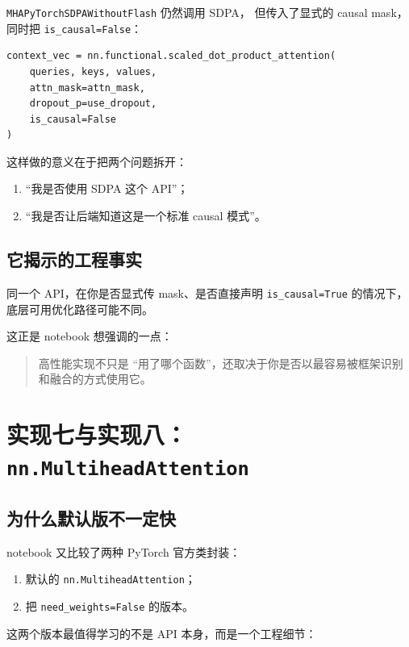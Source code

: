 \documentclass[12pt,a4paper]{ctexart}
\newcommand{\code}[1]{\texttt{#1}}
\begin{document}
\code{MHAPyTorchSDPAWithoutFlash} 仍然调用 SDPA，
但传入了显式的 causal mask，同时把 \code{is\_causal=False}：

\begin{lstlisting}[style=py]
context_vec = nn.functional.scaled_dot_product_attention(
    queries, keys, values,
    attn_mask=attn_mask,
    dropout_p=use_dropout,
    is_causal=False
)
\end{lstlisting}

这样做的意义在于把两个问题拆开：

\begin{enumerate}
  \item ``我是否使用 SDPA 这个 API''；
  \item ``我是否让后端知道这是一个标准 causal 模式''。
\end{enumerate}

\subsection{它揭示的工程事实}

同一个 API，在你是否显式传 mask、是否直接声明 \code{is\_causal=True}
的情况下，底层可用优化路径可能不同。

这正是 notebook 想强调的一点：

\begin{quote}
高性能实现不只是 ``用了哪个函数''，还取决于你是否以最容易被框架识别和融合的方式使用它。
\end{quote}

\section{实现七与实现八：\texorpdfstring{\code{nn.MultiheadAttention}}{nn.MultiheadAttention}}

\subsection{为什么默认版不一定快}

notebook 又比较了两种 PyTorch 官方类封装：

\begin{enumerate}
  \item 默认的 \code{nn.MultiheadAttention}；
  \item 把 \code{need\_weights=False} 的版本。
\end{enumerate}

这两个版本最值得学习的不是 API 本身，而是一个工程细节：
\end{document}
